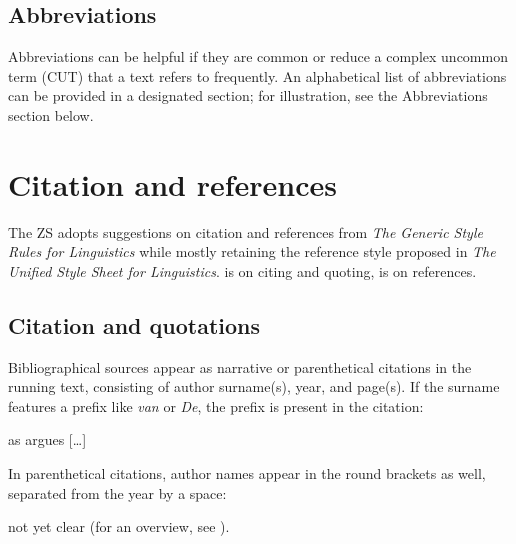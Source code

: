 \documentclass{zsarticle}
\begin{document}
\subsection{Abbreviations}\label{sec:abbrev-sec}

Abbreviations can be helpful if they are common or reduce a complex uncommon term (CUT) that a text refers to frequently. An alphabetical list of abbreviations can be provided in a designated section; for illustration, see the Abbreviations section below.

\section{Citation and references}\label{sec:citation}

The ZS adopts suggestions on citation and references from \textit{The Generic Style Rules for Linguistics} while mostly retaining the reference style proposed in \textit{The Unified Style Sheet for Linguistics}.  is on citing and quoting,  is on references.

\subsection{Citation and quotations}\label{sec:citing}

Bibliographical sources appear as narrative or parenthetical citations in the running text, consisting of author surname(s), year, and page(s). If the surname features a prefix like \emph{van} or \emph{De}, the prefix is present in the citation:

\begin{zsquote}
[\ldots] as \textcite[125--126]{vangelderen2022} argues [\ldots]
\end{zsquote}

In parenthetical citations, author names appear in the round brackets as well, separated from the year by a space:

\begin{zsquote}
[\ldots] not yet clear (for an overview, see \cite{vangelderen2022}).
\end{zsquote}
\end{document}
